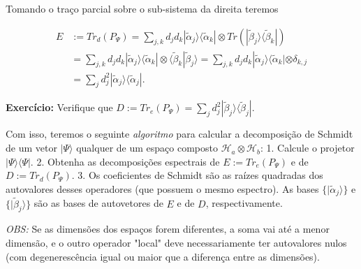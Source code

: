 \documentclass[11pt]{article}
\begin{document}
Tomando o traço parcial sobre o sub-sistema da direita teremos

\begin{align}
E&:=Tr_{d}(P_{\Psi})=\sum_{j,k}d_{j}d_{k}|\tilde{\alpha}_{j}\rangle\langle\tilde{\alpha}_{k}|\otimes Tr(|\tilde{\beta}_{j}\rangle\langle\tilde{\beta}_{k}|) \\
&=\sum_{j,k}d_{j}d_{k}|\tilde{\alpha}_{j}\rangle\langle\tilde{\alpha}_{k}|\otimes \langle\tilde{\beta}_{k}|\tilde{\beta}_{j}\rangle =\sum_{j,k}d_{j}d_{k}|\tilde{\alpha}_{j}\rangle\langle\tilde{\alpha}_{k}|\otimes\delta_{k,j}\\
&=\sum_{j}d_{j}^{2}|\tilde{\alpha}_{j}\rangle\langle\tilde{\alpha}_{j}|.
\end{align}

\textbf{Exercício:} Verifique que
\(D:=Tr_{e}(P_{\Psi})=\sum_{j}d_{j}^{2}|\tilde{\beta}_{j}\rangle\langle\tilde{\beta}_{j}|\).

Com isso, teremos o seguinte \emph{algoritmo} para calcular a
decomposição de Schmidt de um vetor \(|\Psi\rangle\) qualquer de um
espaço composto \(\mathcal{H}_{a}\otimes\mathcal{H}_{b}\): 1. Calcule o
projetor \(|\Psi\rangle\langle\Psi|\). 2. Obtenha as decomposições
espectrais de \(E:=Tr_{e}(P_{\Psi})\) e de \(D:=Tr_{d}(P_{\Psi})\). 3.
Os coeficientes de Schmidt são as raízes quadradas dos autovalores
desses operadores (que possuem o mesmo espectro). As bases
\(\{|\tilde{\alpha}_{j}\rangle\}\) e \(\{|\tilde{\beta}_{j}\rangle\}\)
são as bases de autovetores de \(E\) e de \(D\), respectivamente.

\emph{OBS:} Se as dimensões dos espaços forem diferentes, a soma vai até
a menor dimensão, e o outro operador "local" deve necessariamente ter
autovalores nulos (com degenerescência igual ou maior que a diferença
entre as dimensões).


    
    
    
    
\end{document}
